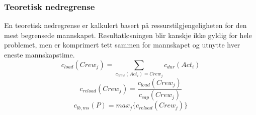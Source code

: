 \subsubsection{Teoretisk nedregrense}
\label{sec:teoretisknedre}
En teoretisk nedregrense er kalkulert basert på ressurstilgjengeligheten for den mest begrensede mannskapet. Resultatløsningen blir kanskje ikke gyldig for hele problemet, men er komprimert tett sammen for mannskapet og utnytte hver eneste mannskapstime.
\begin{equation}
c_{load}(Crew_{j}) = \sum_{c_{crew}(Act_{i}) = Crew_{j}} c_{dur}(Act_{i})
\end{equation}
\begin{equation}
c_{reload}(Crew_{j}) = \frac{c_{load}(Crew_{j})}{c_{cap}(Crew_{j})}
\label{eq:mannskapsstyrke}
\end{equation}
\begin{equation}
c_{lb,ms}(P) = max_{j}\{ c_{reload}(Crew_{j}) \}
\end{equation}